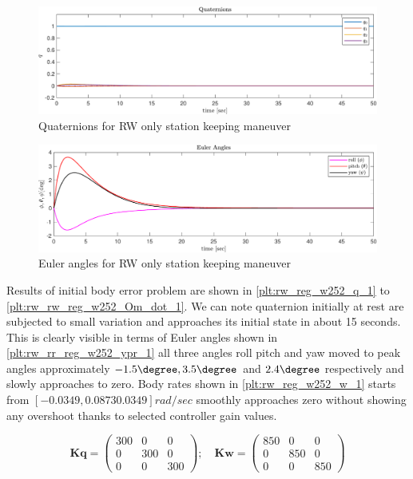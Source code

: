 \begin{figure}[H]
     \centering
    \includegraphics[width=0.8\columnwidth]{figures/plots/RW/rw_reg_w252_q.pdf}
    \caption{Quaternions for RW only station keeping maneuver}
    \label{plt:rw_reg_w252_q_1}
\end{figure}


\begin{figure}[H]
    \centering
    \includegraphics[width=0.8\columnwidth]{figures/plots/RW/rw_reg_w252_ypr.pdf}
    \caption{Euler angles for RW only station keeping maneuver}
    \label{plt:rw_rr_reg_w252_ypr_1}
\end{figure}
\noindent Results of initial body error problem are shown in \autoref{plt:rw_reg_w252_q_1} to  \autoref{plt:rw_rw_reg_w252_Om_dot_1}. We can note quaternion initially at rest are subjected to small variation and approaches its initial state in about 15 seconds. This is clearly visible in terms of Euler angles shown in \autoref{plt:rw_rr_reg_w252_ypr_1} all three angles roll pitch and yaw moved to peak angles approximately $ -1.5\degree, 3.5\degree $ and $ 2.4\degree $ respectively and slowly approaches to zero. Body rates shown in \autoref{plt:rw_reg_w252_w_1} starts from $ [-0.0349, 0.0873 0.0349] rad/sec$ smoothly approaches zero without showing any overshoot thanks to selected controller gain values. 

\begin{equation}
\mathbf{Kq} =\begin{pmatrix}
300 & 0 & 0\\
0 & 300 & 0\\
0 & 0 & 300
\end{pmatrix} ;\quad \mathbf{Kw} =\begin{pmatrix}
850 & 0 & 0\\
0 & 850 & 0\\
0 & 0 & 850
\end{pmatrix}
\label{eqn:RWO_gains}
\end{equation}

